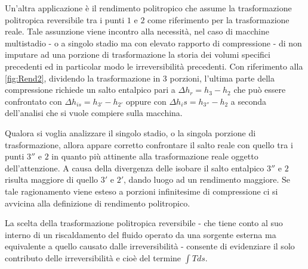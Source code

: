 Un'altra applicazione è il rendimento politropico che assume la trasformazione politropica reversibile tra i punti $1$ e $2$ come riferimento per la trasformazione reale. Tale assunzione viene incontro alla necessità, nel caso di macchine multistadio - o a singolo stadio ma con elevato rapporto di compressione - di non imputare ad una porzione di trasformazione la storia dei volumi specifici precedenti ed in particolar modo le irreversibilità precedenti. Con riferimento alla \ref{fig:Rend2}, dividendo la trasformazione in 3 porzioni, l'ultima parte della compressione richiede un salto entalpico pari a $\Delta h_r = h_3 - h_2$ che può essere confrontato con $\Delta h_{is} = h_{3'} - h_{2'}$ oppure con $\Delta h_is = h_{3''} - h_2$ a seconda dell'analisi che si vuole compiere sulla macchina.

Qualora si voglia analizzare il singolo stadio, o la singola porzione di trasformazione, allora appare corretto confrontare il salto reale con quello tra i punti $3''$ e $2$ in quanto più attinente alla trasformazione reale oggetto dell'attenzione. A causa della divergenza delle isobare il salto entalpico $3''$ e $2$ risulta maggiore di quello $3'$ e $2'$, dando luogo ad un rendimento maggiore. Se tale ragionamento viene esteso a porzioni infinitesime di compressione ci si avvicina alla definizione di rendimento politropico.

La scelta della trasformazione politropica reversibile - che tiene conto al suo interno di un riscaldamento del fluido operato da una sorgente esterna ma equivalente a quello causato dalle irreversibilità - consente di evidenziare il solo contributo delle irreversibilità e cioè del termine $\int Tds$.

